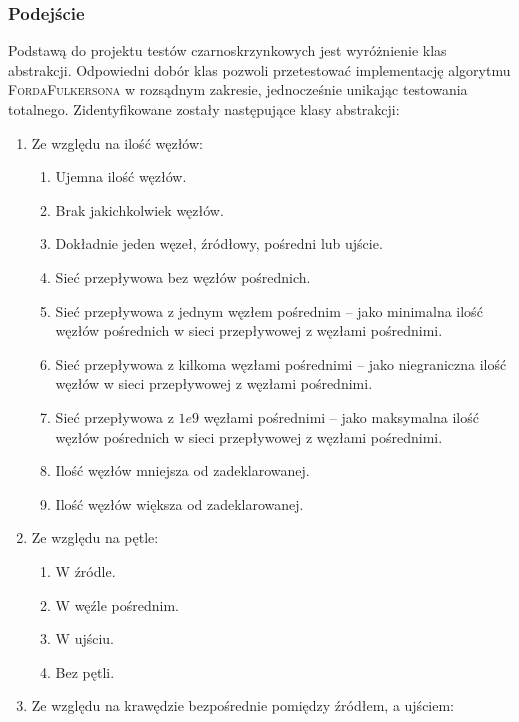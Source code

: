 \subsubsection{Podejście}
Podstawą do projektu testów czarno\dywiz skrzynkowych jest wyróżnienie klas
abstrakcji. Odpowiedni dobór klas pozwoli przetestować implementację
algorytmu \textsc{Forda\dywiz Fulkersona} w rozsądnym zakresie, jednocześnie
unikając testowania totalnego. Zidentyfikowane zostały następujące klasy
abstrakcji:
\begin{enumerate}
    \item Ze względu na ilość węzłów:
        \begin{enumerate}
            \item Ujemna ilość węzłów.
            \item Brak jakichkolwiek węzłów.
            \item Dokładnie jeden węzeł, źródłowy, pośredni lub ujście.
            \item Sieć przepływowa bez węzłów pośrednich.
            \item Sieć przepływowa z jednym węzłem pośrednim -- jako minimalna
                ilość węzłów pośrednich w sieci przepływowej z węzłami
                pośrednimi.
            \item Sieć przepływowa z kilkoma węzłami pośrednimi -- jako
                niegraniczna ilość węzłów w sieci przepływowej z węzłami
                pośrednimi.
            \item Sieć przepływowa z $1e9$ węzłami pośrednimi -- jako maksymalna
                ilość węzłów pośrednich w sieci przepływowej z węzłami
                pośrednimi.
            \item Ilość węzłów mniejsza od zadeklarowanej.
            \item Ilość węzłów większa od zadeklarowanej.
        \end{enumerate}
    \item Ze względu na pętle:
        \begin{enumerate}
            \item W źródle.
            \item W węźle pośrednim.
            \item W ujściu.
            \item Bez pętli.
        \end{enumerate}
    \item Ze względu na krawędzie bezpośrednie pomiędzy źródłem, a ujściem:
        \begin{enumerate}

\end{enumerate}
\end{enumerate}
